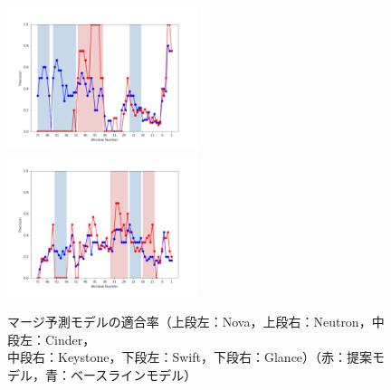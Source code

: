 \documentclass[submit]{ipsj}
\begin{document}
\begin{figure}[t]
\begin{minipage}{\textwidth}
\begin{center}
    \includegraphics[width=0.495\textwidth]{Uenaka_fig/RQ2_result/Swift/Swift_merge_Precision.pdf}
    \includegraphics[width=0.495\textwidth]{Uenaka_fig/RQ2_result/Glance/Glance_merge_Precision.pdf}
    \caption{マージ予測モデルの適合率（上段左：Nova，上段右：Neutron，中段左：Cinder，\\ 中段右：Keystone，下段左：Swift，下段右：Glance）（赤：提案モデル，青：ベースラインモデル）}
    \label{fig:merge_p}
\end{center}
\vspace{0.08\textheight}
\end{minipage}
\end{figure}
\end{document}
